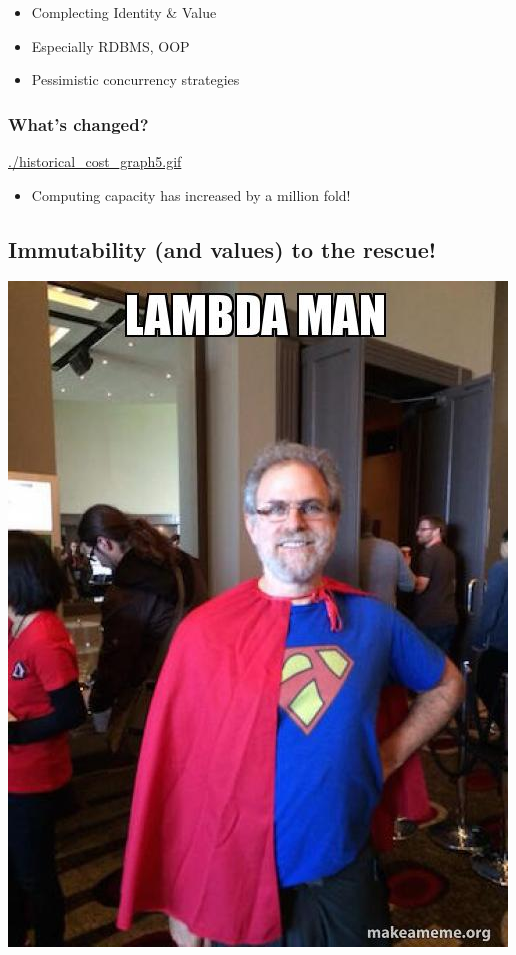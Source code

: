 \documentclass[11pt]{article}
\begin{document}
\begin{itemize}
\item Complecting Identity \& Value
\end{itemize}
\begin{itemize}
\item Especially RDBMS, OOP
\end{itemize}
\begin{itemize}
\item Pessimistic concurrency strategies
\end{itemize}

\subsubsection*{What's changed?}
\label{sec:orgheadline15}
\url{./historical_cost_graph5.gif}

\begin{itemize}
\item Computing capacity has increased by a million fold!
\end{itemize}

\subsection*{Immutability (and values) to the rescue!}
\label{sec:orgheadline19}

\includegraphics[width=.9\linewidth]{./lambda-man.jpg}
\end{document}
